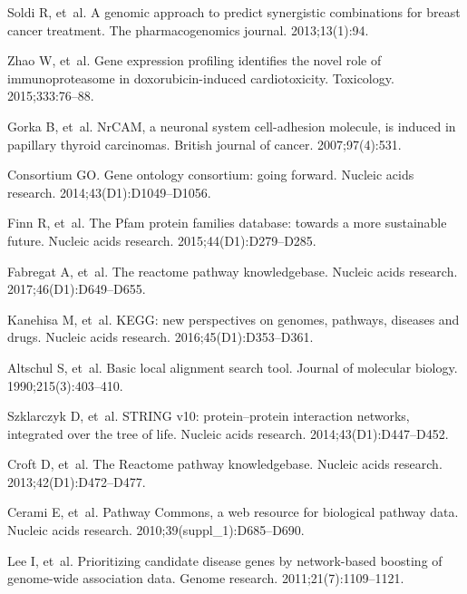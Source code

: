 \documentclass[10pt,letterpaper]{article}
\begin{document}
\begin{thebibliography}{10}
Soldi R, et~al.
\newblock A genomic approach to predict synergistic combinations for breast
  cancer treatment.
\newblock The pharmacogenomics journal. 2013;13(1):94.

Zhao W, et~al.
\newblock Gene expression profiling identifies the novel role of
  immunoproteasome in doxorubicin-induced cardiotoxicity.
\newblock Toxicology. 2015;333:76--88.

Gorka B, et~al.
\newblock NrCAM, a neuronal system cell-adhesion molecule, is induced in
  papillary thyroid carcinomas.
\newblock British journal of cancer. 2007;97(4):531.

Consortium GO.
\newblock Gene ontology consortium: going forward.
\newblock Nucleic acids research. 2014;43(D1):D1049--D1056.

Finn R, et~al.
\newblock The Pfam protein families database: towards a more sustainable
  future.
\newblock Nucleic acids research. 2015;44(D1):D279--D285.

Fabregat A, et~al.
\newblock The reactome pathway knowledgebase.
\newblock Nucleic acids research. 2017;46(D1):D649--D655.

Kanehisa M, et~al.
\newblock KEGG: new perspectives on genomes, pathways, diseases and drugs.
\newblock Nucleic acids research. 2016;45(D1):D353--D361.

Altschul S, et~al.
\newblock Basic local alignment search tool.
\newblock Journal of molecular biology. 1990;215(3):403--410.

Szklarczyk D, et~al.
\newblock STRING v10: protein--protein interaction networks, integrated over
  the tree of life.
\newblock Nucleic acids research. 2014;43(D1):D447--D452.

Croft D, et~al.
\newblock The Reactome pathway knowledgebase.
\newblock Nucleic acids research. 2013;42(D1):D472--D477.

Cerami E, et~al.
\newblock Pathway Commons, a web resource for biological pathway data.
\newblock Nucleic acids research. 2010;39(suppl\_1):D685--D690.

Lee I, et~al.
\newblock Prioritizing candidate disease genes by network-based boosting of
  genome-wide association data.
\newblock Genome research. 2011;21(7):1109--1121.


\end{thebibliography}
\end{document}
